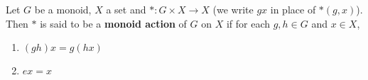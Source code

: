\documentclass{book}
\begin{document}
	\begin{defn}
	Let $G$ be a monoid, $X$ a set and $*: G \times X \rightarrow X$ (we write $gx$ in place of $*(g,x)$). Then $*$ is said to be a \textbf{monoid action} of $G$ on $X$ if for each $g,h \in G$ and $x \in X$,
	\begin{enumerate}
	\item $(gh)x = g(hx)$
	\item $ex = x$
	\end{enumerate}
	\end{defn}










































 
 
 
 
 
 
 
 
 
 
 
 
 
 
 
 
 
 
 
 
 
 
 
 
 
 
 
 
 
 
 
 
 
 
 
 
 
 
 
 
 
 
 
 
 
 
 
 
 
 
 
 
\end{document}
